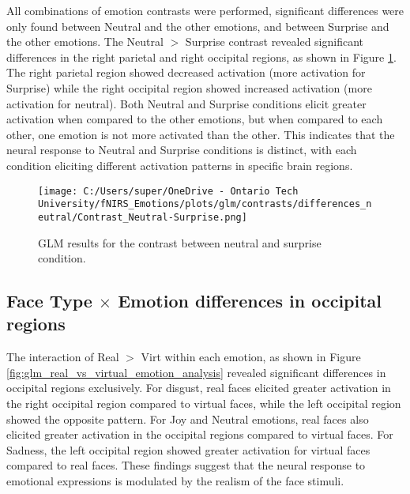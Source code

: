 All combinations of emotion contrasts were performed, significant differences were only found between Neutral and the other emotions, and between Surprise and the other emotions.
The Neutral $>$ Surprise contrast revealed significant differences in the right parietal and right occipital regions, as shown in Figure \ref{fig:glm_neutral_vs_surprise}. 
The right parietal region showed decreased activation (more activation for Surprise) while the right occipital region showed increased activation (more activation for neutral).
Both Neutral and Surprise conditions elicit greater activation when compared to the other emotions, but when compared to each other, one emotion is not more activated than the other.
This indicates that the neural response to Neutral and Surprise conditions is distinct, with each condition eliciting different activation patterns in specific brain regions.

\begin{figure}[H]
    \centering
      \texttt{[image: C:/Users/super/OneDrive - Ontario Tech University/fNIRS\_Emotions/plots/glm/contrasts/differences\_neutral/Contrast\_Neutral-Surprise.png]}
      \caption[GLM: Neutral vs. Surprise]{GLM results for the contrast between neutral and surprise condition.}
      \label{fig:glm_neutral_vs_surprise}
\end{figure}

\subsection{Face Type \texorpdfstring{$\times$}{x} Emotion differences in occipital regions}
The interaction of Real $>$ Virt within each emotion, as shown in Figure \ref{fig:glm_real_vs_virtual_emotion_analysis} revealed significant differences in occipital regions exclusively.
For disgust, real faces elicited greater activation in the right occipital region compared to virtual faces, while the left occipital region showed the opposite pattern.
For Joy and Neutral emotions, real faces also elicited greater activation in the occipital regions compared to virtual faces.
For Sadness, the left occipital region showed greater activation for virtual faces compared to real faces.
These findings suggest that the neural response to emotional expressions is modulated by the realism of the face stimuli. 


